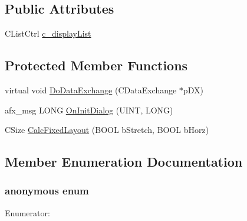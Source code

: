 \subsection*{Public Attributes}
\begin{DoxyCompactItemize}
\item 
CListCtrl \hyperlink{classCDlgBarReview_af12843d17ae7d891829c263f8e99de2d}{c\_\-displayList}
\end{DoxyCompactItemize}
\subsection*{Protected Member Functions}
\begin{DoxyCompactItemize}
\item 
virtual void \hyperlink{classCDlgBarReview_ae005ec237e20b064d5cd8f21407f25e7}{DoDataExchange} (CDataExchange $\ast$pDX)
\item 
afx\_\-msg LONG \hyperlink{classCDlgBarReview_a967584fe60e10e73173511549c6a47c2}{OnInitDialog} (UINT, LONG)
\item 
CSize \hyperlink{classCDlgBarReview_a023f65c2ba933c8e91c1c13cffaaf9dd}{CalcFixedLayout} (BOOL bStretch, BOOL bHorz)
\end{DoxyCompactItemize}


\subsection{Member Enumeration Documentation}
\hypertarget{classCDlgBarReview_a6a9a9fee783a324a502b8a996c5fe351}{
\subsubsection[{"@6}]{\setlength{\rightskip}{0pt plus 5cm}anonymous enum}}
\label{classCDlgBarReview_a6a9a9fee783a324a502b8a996c5fe351}
\begin{Desc}
\item[Enumerator: ]\par
\begin{description}
\item[{\em 
\hypertarget{classCDlgBarReview_a6a9a9fee783a324a502b8a996c5fe351a4f7775206eb9222335a9760f01574102}{
IDD}
\label{classCDlgBarReview_a6a9a9fee783a324a502b8a996c5fe351a4f7775206eb9222335a9760f01574102}
}]\end{description}
\end{Desc}



